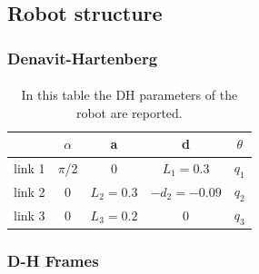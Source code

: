 \documentclass{article}
\begin{document}
\subsection{Robot structure}
\subsubsection*{Denavit-Hartenberg}
\paragraph{}
\FloatBarrier
\begin{table}[!htbp]
\centering
\begin{tabular}{|c|cccc|}
\hline
& $\alpha$ & a & d & $\theta$\\
\hline
link 1 & $\pi$/2 & 0 & $L_1=0.3$ & $q_1$\\
link 2 & 0 & $L_2=0.3$ & $-d_2=-0.09$ & $q_2$\\
link 3 & 0 & $L_3=0.2$ & 0 & $q_3$\\
\hline
\end{tabular}
\caption{In this table the DH parameters of the robot are reported.}
\end{table}
\subsubsection*{D-H Frames}
\end{document}
